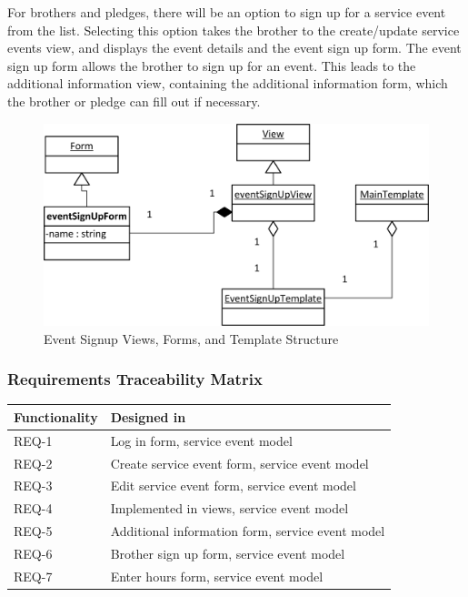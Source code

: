 \documentclass{article}
\begin{document}
For brothers and pledges, there will be an option to sign up for a service event from the list. Selecting this option takes the brother to the create/update service events view, and displays the event details and the event sign up form. The event sign up form allows the brother to sign up for an event. This leads to the additional information view, containing the additional information form, which the brother or pledge can fill out if necessary.

\FloatBarrier
\begin{figure}[h!]
\centering
\includegraphics[scale=.65]{img/viewFormTemplateDiagrams/eventSignUp}
\caption{Event Signup Views, Forms, and Template Structure}
\label{fig:eventSignupViewFormTemplateDiagram}
\end{figure}
\FloatBarrier

\subsubsection{Requirements Traceability Matrix}

\FloatBarrier
\begin{table}
    \begin{tabular}{|l|l|}
        \hline
        Functionality & Designed in                                      \\ \hline
        REQ-1         & Log in form, service event model                 \\ 
        REQ-2         & Create service event form, service event model   \\ 
        REQ-3         & Edit service event form, service event model     \\ 
        REQ-4         & Implemented in views, service event model        \\ 
        REQ-5         & Additional information form, service event model \\ 
        REQ-6         & Brother sign up form, service event model        \\ 
        REQ-7         & Enter hours form, service event model            \\
        \hline
    \end{tabular}
\end{table}
\FloatBarrier
\end{document}
